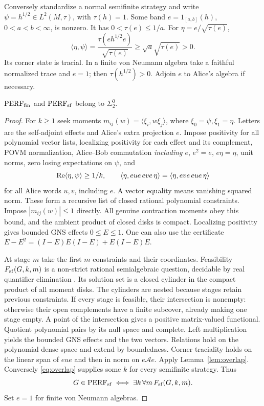 Conversely standardize a normal semifinite strategy and write $\psi=h^{1/2}\in L^2(M,\tau)$, with $\tau(h)=1$. Some band $e=1_{[a,b]}(h)$, $0<a<b<\infty$, is nonzero. It has $0<\tau(e)\leq1/a$. For $\eta=e/\sqrt{\tau(e)}$,
\begin{equation}\label{eq:overlap}
 \langle\eta,\psi\rangle
 =\frac{\tau(eh^{1/2}e)}{\sqrt{\tau(e)}}
 \geq\sqrt a\sqrt{\tau(e)}>0.
\end{equation}
Its corner state is tracial. In a finite von Neumann algebra take a faithful normalized trace and $e=1$; then $\tau(h^{1/2})>0$. Adjoin $e$ to Alice's algebra if necessary.

\begin{theorem}\label{thm:upper}
$\mathrm{PERF}_{\mathrm{fin}}$ and $\mathrm{PERF}_{\mathrm{sf}}$ belong to $\Sigma^0_2$.
\end{theorem}
\begin{proof}
For $k\geq1$ seek moments $m_{ij}(w)=\langle\xi_i,w\xi_j\rangle$, where $\xi_0=\psi,\xi_1=\eta$. Letters are the self-adjoint effects and Alice's extra projection $e$. Impose positivity for all polynomial vector lists, localizing positivity for each effect and its complement, POVM normalization, Alice--Bob commutation \emph{including $e$}, $e^2=e$, $e\eta=\eta$, unit norms, zero losing expectations on $\psi$, and
\[
 \operatorname{Re}\langle\eta,\psi\rangle\geq1/k,\qquad
 \langle\eta,eue\,eve\,\eta\rangle
 =\langle\eta,eve\,eue\,\eta\rangle
\]
for all Alice words $u,v$, including $e$. A vector equality means vanishing squared norm. These form a recursive list of closed rational polynomial constraints. Impose $|m_{ij}(w)|\leq1$ directly. All genuine contraction moments obey this bound, and the ambient product of closed disks is compact. Localizing positivity gives bounded GNS effects $0\leq E\leq1$. One can also use the certificate $E-E^2=(I-E)E(I-E)+E(I-E)E$.

At stage $m$ take the first $m$ constraints and their coordinates. Feasibility $F_{\mathrm{sf}}(G,k,m)$ is a non-strict rational semialgebraic question, decidable by real quantifier elimination \cite{BPR}. Its solution set is a closed cylinder in the compact product of all moment disks. The cylinders are nested because stages retain previous constraints. If every stage is feasible, their intersection is nonempty: otherwise their open complements have a finite subcover, already making one stage empty. A point of the intersection gives a positive matrix-valued functional. Quotient polynomial pairs by its null space and complete. Left multiplication yields the bounded GNS effects and the two vectors. Relations hold on the polynomial dense space and extend by boundedness. Corner traciality holds on the linear span of $eue$ and then in norm on $e\mathcal A e$. Apply Lemma~\ref{lem:overlap}. Conversely \eqref{eq:overlap} supplies some $k$ for every semifinite strategy. Thus
\begin{equation}\label{eq:sigma2sf}
 G\in\mathrm{PERF}_{\mathrm{sf}}\iff\exists k\,\forall m\,F_{\mathrm{sf}}(G,k,m).
\end{equation}
Set $e=1$ for finite von Neumann algebras.
\end{proof}


